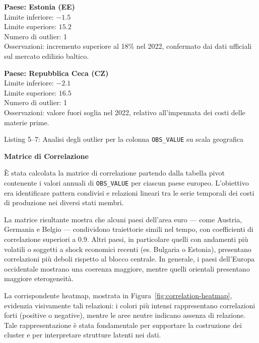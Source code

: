 \documentclass[conference]{IEEEtran}
\begin{document}
\vspace{1em} \noindent \textbf{Paese: Estonia (EE)} \\ Limite inferiore: $-1.5$ \\ Limite superiore: $15.2$ \\ Numero di outlier: 1 \\ Osservazioni: incremento superiore al 18\% nel 2022, confermato dai dati ufficiali sul mercato edilizio baltico.

\vspace{1em} \noindent \textbf{Paese: Repubblica Ceca (CZ)} \\ Limite inferiore: $-2.1$ \\ Limite superiore: $16.5$ \\ Numero di outlier: 1 \\ Osservazioni: valore fuori soglia nel 2022, relativo all’impennata dei costi delle materie prime.

\begin{flushright} Listing 5–7: Analisi degli outlier per la colonna \texttt{OBS\_VALUE} su scala geografica \end{flushright}




\vspace{1em} \noindent\textbf{Matrice di Correlazione}
\vspace{1em}

È stata calcolata la matrice di correlazione partendo dalla tabella pivot contenente i valori annuali di \texttt{OBS\_VALUE} per ciascun paese europeo. L’obiettivo era identificare pattern condivisi e relazioni lineari tra le serie temporali dei costi di produzione nei diversi stati membri.

La matrice risultante mostra che alcuni paesi dell’area euro — come Austria, Germania e Belgio — condividono traiettorie simili nel tempo, con coefficienti di correlazione superiori a 0.9. Altri paesi, in particolare quelli con andamenti più volatili o soggetti a shock economici recenti (es. Bulgaria o Estonia), presentano correlazioni più deboli rispetto al blocco centrale. In generale, i paesi dell’Europa occidentale mostrano una coerenza maggiore, mentre quelli orientali presentano maggiore eterogeneità.

La corrispondente heatmap, mostrata in Figura~\ref{fig:correlation-heatmap}, evidenzia visivamente tali relazioni: i colori più intensi rappresentano correlazioni forti (positive o negative), mentre le aree neutre indicano assenza di relazione. Tale rappresentazione è stata fondamentale per supportare la costruzione dei cluster e per interpretare strutture latenti nei dati.
\end{document}
